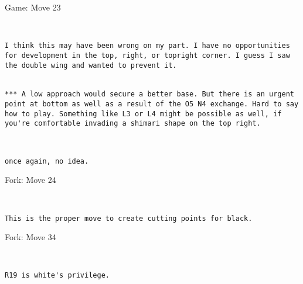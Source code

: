 \documentclass[twocolumn]{article}
\begin{document}
\begin{section}{Game: Move 23}
\begin{center}
\cleargoban
{}
\showfullgoban
\\\begin{lstlisting}
I think this may have been wrong on my part. I have no opportunities for development in the top, right, or topright corner. I guess I saw the double wing and wanted to prevent it.


*** A low approach would secure a better base. But there is an urgent point at bottom as well as a result of the O5 N4 exchange. Hard to say how to play. Something like L3 or L4 might be possible as well, if you're comfortable invading a shimari shape on the top right.\end{lstlisting}
\end{center}
\begin{center}
\cleargoban
{}
\showfullgoban
\\\begin{lstlisting}
once again, no idea.\end{lstlisting}
\end{center}
\end{section}
\begin{subsection}{Fork: Move 24}
\begin{center}
\cleargoban
{}
\showfullgoban
\\\begin{lstlisting}
This is the proper move to create cutting points for black.\end{lstlisting}
\end{center}
\end{subsection}
\begin{subsection}{Fork: Move 34}
\begin{center}
\cleargoban
{}
\showfullgoban
\\\begin{lstlisting}
R19 is white's privilege.\end{lstlisting}
\end{center}
\end{subsection}
\end{document}
